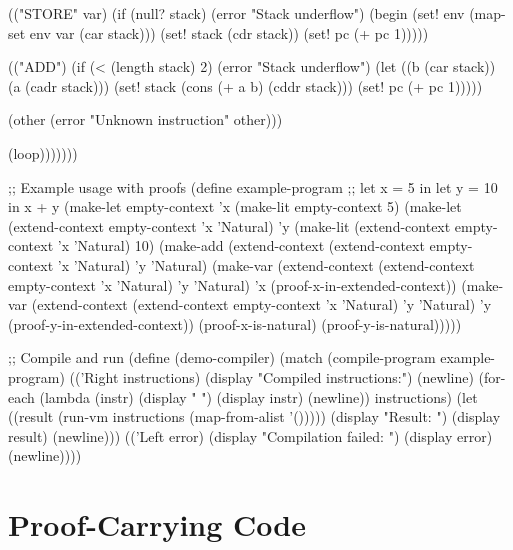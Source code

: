 \begin{example}
\begin{lambdustcode}
                (("STORE" var)
                 (if (null? stack)
                     (error "Stack underflow")
                     (begin
                       (set! env (map-set env var (car stack)))
                       (set! stack (cdr stack))
                       (set! pc (+ pc 1)))))
                
                (("ADD")
                 (if (< (length stack) 2)
                     (error "Stack underflow")
                     (let ((b (car stack))
                           (a (cadr stack)))
                       (set! stack (cons (+ a b) (cddr stack)))
                       (set! pc (+ pc 1)))))
                
                (other
                 (error "Unknown instruction" other)))
              
              (loop)))))))

;; Example usage with proofs
(define example-program
  ;; let x = 5 in let y = 10 in x + y
  (make-let empty-context 'x 
    (make-lit empty-context 5)
    (make-let (extend-context empty-context 'x 'Natural) 'y
      (make-lit (extend-context empty-context 'x 'Natural) 10)
      (make-add (extend-context 
                  (extend-context empty-context 'x 'Natural) 'y 'Natural)
                (make-var (extend-context 
                           (extend-context empty-context 'x 'Natural) 'y 'Natural)
                         'x (proof-x-in-extended-context))
                (make-var (extend-context 
                           (extend-context empty-context 'x 'Natural) 'y 'Natural)
                         'y (proof-y-in-extended-context))
                (proof-x-is-natural) (proof-y-is-natural)))))

;; Compile and run
(define (demo-compiler)
  (match (compile-program example-program)
    (('Right instructions)
     (display "Compiled instructions:") (newline)
     (for-each (lambda (instr) (display "  ") (display instr) (newline)) instructions)
     (let ((result (run-vm instructions (map-from-alist '()))))
       (display "Result: ") (display result) (newline)))
    (('Left error)
     (display "Compilation failed: ") (display error) (newline))))
\end{lambdustcode}
\end{example}

\section{Proof-Carrying Code}
\label{sec:proof-carrying-code}

